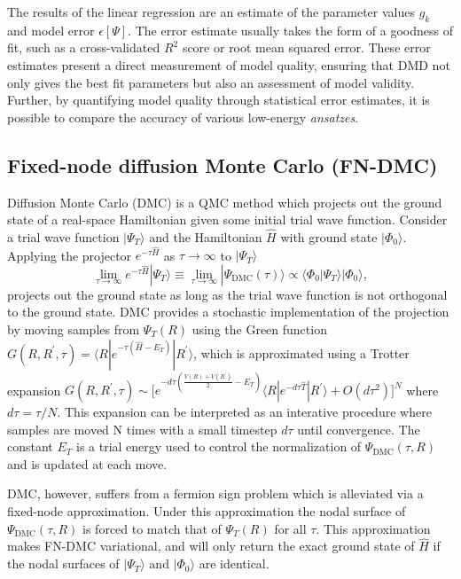 \documentclass[12pt]{article}
\begin{document}
The results of the linear regression are an estimate of the parameter values $g_k$ and model error $\epsilon[\Psi]$.
The error estimate usually takes the form of a goodness of fit, such as a cross-validated $R^2$ score or root mean squared error.
These error estimates present a direct measurement of model quality, ensuring that DMD not only gives the best fit parameters but also an assessment of model validity.
Further, by quantifying model quality through statistical error estimates, it is possible to compare the accuracy of various low-energy \textit{ansatzes}.

\subsection{Fixed-node diffusion Monte Carlo (FN-DMC)}
Diffusion Monte Carlo (DMC) is a QMC method which projects out the ground state of a real-space Hamiltonian given some initial trial wave function.
Consider a trial wave function $|\Psi_T\rangle$ and the Hamiltonian $\hat{H}$ with ground state $|\Phi_0\rangle$. 
Applying the projector $e^{-\tau \hat{H}}$ as $\tau \rightarrow \infty$ to $|\Psi_T \rangle$
\begin{equation}
\lim_{\tau \rightarrow \infty} e^{-\tau \hat{H}} |\Psi_T\rangle 
\equiv \lim_{\tau \rightarrow \infty} |\Psi_\text{DMC}(\tau)\rangle \propto \langle \Phi_0|\Psi_T\rangle |\Phi_0\rangle,
\end{equation}
projects out the ground state as long as the trial wave function is not orthogonal to the ground state. 
DMC provides a stochastic implementation of the projection by moving samples from $\Psi_T(R)$ using the Green function $G(R, R^\prime, \tau) = \langle R | e^{-\tau(\hat{H} - E_T)} | R^\prime \rangle$, which is approximated using a Trotter expansion $G(R, R^\prime, \tau) \sim \Big[e^{-d\tau(\frac{V(R) + V(R^\prime)}{2} - E_T)} \langle R| e^{-d\tau\hat{T}}|R^\prime \rangle + O(d\tau^2) \Big]^N $ 
where $d\tau = \tau/N$.
This expansion can be interpreted as an interative procedure where samples are moved N times with a small timestep $d\tau$ until convergence.
The constant $E_T$ is a trial energy used to control the normalization of $\Psi_\text{DMC}(\tau, R)$ and is updated at each move.

DMC, however, suffers from a fermion sign problem which is alleviated via a fixed-node approximation.
Under this approximation the nodal surface of $\Psi_\text{DMC}(\tau, R)$ is forced to match that of $\Psi_T(R)$ for all $\tau$.
This approximation makes FN-DMC variational, and will only return the exact ground state of $\hat{H}$ if the nodal surfaces of $|\Psi_T\rangle$ and $|\Phi_0\rangle$ are identical.
\end{document}
